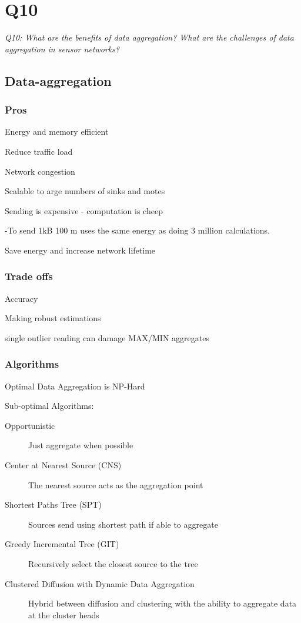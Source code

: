 \chapter{Q10}
\emph{Q10: What are the benefits of data aggregation? What are the challenges
of data aggregation in sensor networks?}

\section{Data-aggregation}

\subsection{Pros}

Energy and memory efficient

Reduce traffic load

Network congestion

Scalable to arge numbers of sinks and motes

Sending is expensive - computation is cheep

-To send 1kB 100 m uses the same energy as doing 3 million calculations.

Save energy and increase network lifetime

\subsection{Trade offs}

Accuracy 

Making robust estimations

single outlier reading can damage MAX/MIN aggregates

\subsection{Algorithms}
Optimal Data Aggregation is NP-Hard

Sub-optimal Algorithms:
\begin{description}
	\item[Opportunistic] Just aggregate when possible
	\item[Center at Nearest Source (CNS)] The nearest source acts as the
		aggregation point
	\item[Shortest Paths Tree (SPT)] Sources send using shortest path if able
		to aggregate
	\item[Greedy Incremental Tree (GIT)] Recursively select the closest source
		to the tree
	\item[Clustered Diffusion with Dynamic Data Aggregation] Hybrid between
		diffusion and clustering with the ability to aggregate data at the
		cluster heads
\end{description}

